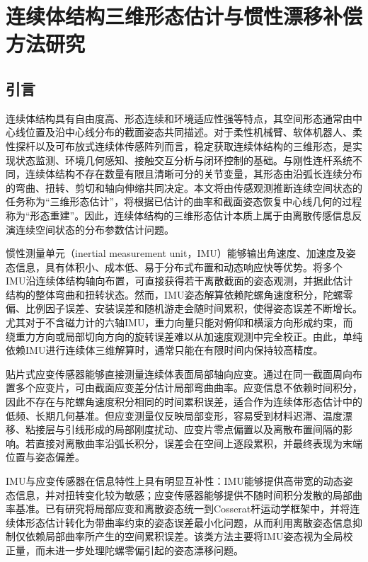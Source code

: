 \chapter{连续体结构三维形态估计与惯性漂移补偿方法研究}
\label{chap:continuum_shape_drift}

\section{引言}
\label{sec:shape_drift_intro}

连续体结构具有自由度高、形态连续和环境适应性强等特点，其空间形态通常由中心线位置及沿中心线分布的截面姿态共同描述。对于柔性机械臂、软体机器人、柔性探杆以及可布放式连续体传感阵列而言，稳定获取连续体结构的三维形态，是实现状态监测、环境几何感知、接触交互分析与闭环控制的基础。与刚性连杆系统不同，连续体结构不存在数量有限且清晰可分的关节变量，其形态由沿弧长连续分布的弯曲、扭转、剪切和轴向伸缩共同决定。本文将由传感观测推断连续空间状态的任务称为“三维形态估计”，将根据已估计的曲率和截面姿态恢复中心线几何的过程称为“形态重建”。因此，连续体结构的三维形态估计本质上属于由离散传感信息反演连续空间状态的分布参数估计问题。

惯性测量单元（inertial measurement unit，IMU）能够输出角速度、加速度及姿态信息，具有体积小、成本低、易于分布式布置和动态响应快等优势。将多个IMU沿连续体结构轴向布置，可直接获得若干离散截面的姿态观测，并据此估计结构的整体弯曲和扭转状态。然而，IMU姿态解算依赖陀螺角速度积分，陀螺零偏、比例因子误差、安装误差和随机游走会随时间累积，使得姿态误差不断增长。尤其对于不含磁力计的六轴IMU，重力向量只能对俯仰和横滚方向形成约束，而绕重力方向或局部切向方向的旋转误差难以从加速度观测中完全校正。由此，单纯依赖IMU进行连续体三维解算时，通常只能在有限时间内保持较高精度。

贴片式应变传感器能够直接测量连续体表面局部轴向应变。通过在同一截面周向布置多个应变片，可由截面应变差分估计局部弯曲曲率。应变信息不依赖时间积分，因此不存在与陀螺角速度积分相同的时间累积误差，适合作为连续体形态估计中的低频、长期几何基准。但应变测量仅反映局部变形，容易受到材料迟滞、温度漂移、粘接层与引线形成的局部刚度扰动、应变片零点偏置以及离散布置间隔的影响。若直接对离散曲率沿弧长积分，误差会在空间上逐段累积，并最终表现为末端位置与姿态偏差。

IMU与应变传感器在信息特性上具有明显互补性：IMU能够提供高带宽的动态姿态信息，并对扭转变化较为敏感；应变传感器能够提供不随时间积分发散的局部曲率基准。已有研究将局部应变和离散姿态统一到Cosserat杆运动学框架中，并将连续体形态估计转化为带曲率约束的姿态误差最小化问题，从而利用离散姿态信息抑制仅依赖局部曲率所产生的空间累积误差\cite{an2024shape}。该类方法主要将IMU姿态视为全局校正量，而未进一步处理陀螺零偏引起的姿态漂移问题。

